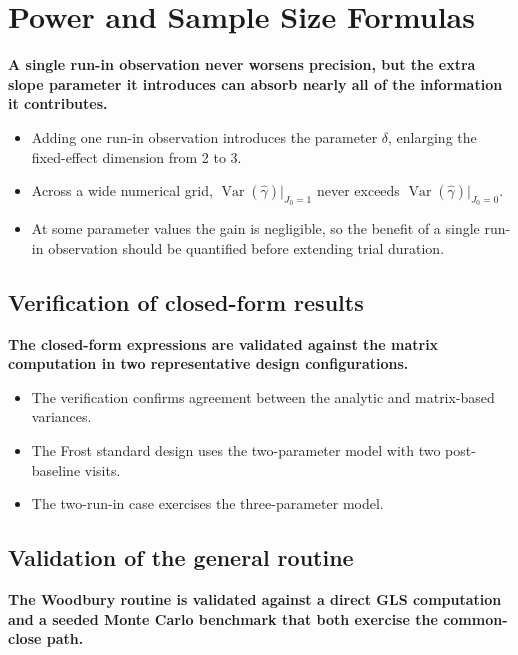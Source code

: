 \documentclass[
  11pt,
]{article}
\begin{document}
\section{Power and Sample Size Formulas}\label{power-and-sample-size-formulas}

\textbf{A single run-in observation never worsens precision, but the extra slope parameter it introduces can absorb nearly all of the information it contributes.}

\begin{itemize}\setlength{\itemsep}{2pt}\setlength{\parskip}{0pt}
\item Adding one run-in observation introduces the parameter $\delta$, enlarging the fixed-effect dimension from 2 to 3.
\item Across a wide numerical grid, $\mathop{\mathrm{Var}}(\hat\gamma)|_{J_0=1}$ never exceeds $\mathop{\mathrm{Var}}(\hat\gamma)|_{J_0=0}$.
\item At some parameter values the gain is negligible, so the benefit of a single run-in observation should be quantified before extending trial duration.
\end{itemize}

\subsection{Verification of closed-form results}\label{verification-of-closed-form-results}

\textbf{The closed-form expressions are validated against the matrix computation in two representative design configurations.}

\begin{itemize}\setlength{\itemsep}{2pt}\setlength{\parskip}{0pt}
\item The verification confirms agreement between the analytic and matrix-based variances.
\item The Frost standard design uses the two-parameter model with two post-baseline visits.
\item The two-run-in case exercises the three-parameter model.
\end{itemize}

\subsection{Validation of the general routine}\label{validation-of-the-general-routine}

\textbf{The Woodbury routine is validated against a direct GLS computation and a seeded Monte Carlo benchmark that both exercise the common-close path.}
\end{document}
